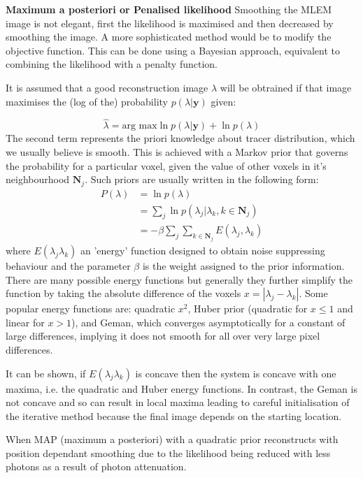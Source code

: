 \documentclass{article}
\begin{document}
\textbf{Maximum a posteriori or Penalised likelihood}
Smoothing the MLEM image is not elegant, first the likelihood is maximised and then decreased by smoothing the image. A more sophisticated method would be to modify the objective function. This can be done using a Bayesian approach, equivalent to combining the likelihood with a penalty function.

It is assumed that a good reconstruction image $\lambda$ will be obtrained if that image maximises the (log of the) probability $p(\lambda|\textbf{y})$ given:

\begin{equation}
\hat{\lambda} = \text{arg max} \ln p(\lambda|\textbf{y}) + \ln p(\lambda)
\end{equation}
The second term represents the priori knowledge about tracer distribution, which we usually believe is smooth. This is achieved with a Markov prior that governs the probability for a particular voxel, given the value of other voxels in it's neighbourhood $\textbf{N}_j$. Such priors are usually written in the following form:
\begin{equation}
\begin{split}
P(\lambda) 
&= \ln p(\lambda)\\
&= \sum_j \ln p(\lambda_j | \lambda_k , k\in \textbf{N}_j)\\
&= -\beta \sum_j \sum_{k\in \textbf{N}_j} E(\lambda_j, \lambda_k)
\end{split}
\end{equation}
where $E(\lambda_j \lambda_k)$ an 'energy' function designed to obtain noise suppressing behaviour and the parameter $\beta$ is the weight assigned to the prior information.
There are many possible energy functions but generally they further simplify the function by taking the absolute difference of the voxels $x =|\lambda_j - \lambda_k|$. Some popular energy functions are: quadratic $x^2$, Huber prior (quadratic for $x \leq 1$ and linear for $x \gt 1$), and Geman, which converges asymptotically for a constant of large differences, implying it does not smooth for all over very large pixel differences. 

It can be shown, if $E(\lambda_j \lambda_k)$ is concave then the system is concave with one maxima, i.e. the quadratic and Huber energy functions. In contrast, the Geman is not concave and so can result in local maxima leading to careful initialisation of the iterative method because the final image depends on the starting location.

When MAP (maximum a posteriori) with a quadratic prior reconstructs with position dependant smoothing due to the likelihood being reduced with less photons as a result of photon attenuation.
\end{document}
